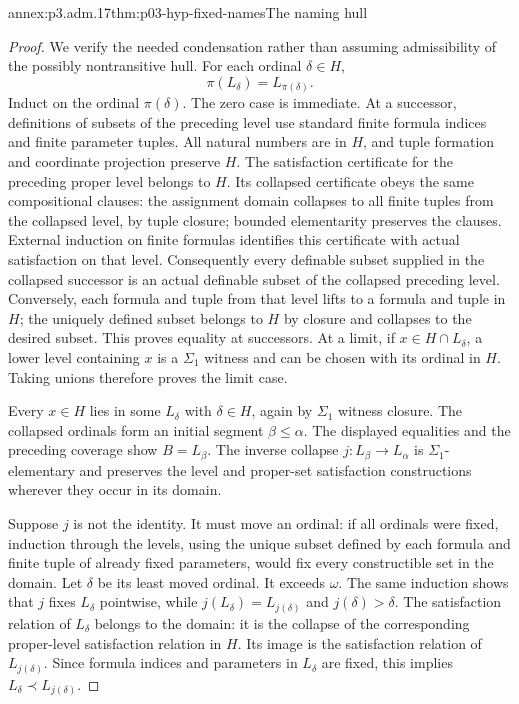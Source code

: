 \begin{annexitem}{annex:p3.adm.17}{thm:p03-hyp-fixed-names}{The naming hull}
\begin{proof}
We verify the needed condensation rather than assuming admissibility
of the possibly nontransitive hull. For each ordinal \(\delta\in H\),
\[
 \pi(L_\delta)=L_{\pi(\delta)}.
\]
Induct on the ordinal \(\pi(\delta)\). The zero case is immediate.
At a successor, definitions of subsets of the preceding level use
standard finite formula indices and finite parameter tuples. All
natural numbers are in \(H\), and tuple formation and coordinate
projection preserve \(H\). The satisfaction certificate for the
preceding proper level belongs to \(H\). Its collapsed certificate
obeys the same compositional clauses: the assignment domain collapses
to all finite tuples from the collapsed level, by tuple closure;
bounded elementarity preserves the clauses. External induction on
finite formulas identifies this certificate with actual satisfaction
on that level. Consequently every definable subset supplied in the
collapsed successor is an actual definable subset of the collapsed
preceding level. Conversely, each formula and tuple from that level
lifts to a formula and tuple in \(H\); the uniquely defined subset
belongs to \(H\) by closure and collapses to the desired subset.
This proves equality at successors. At a limit, if \(x\in H\cap
L_\delta\), a lower level containing \(x\) is a \(\Sigma_1\)
witness and can be chosen with its ordinal in \(H\). Taking unions
therefore proves the limit case.

Every \(x\in H\) lies in some \(L_\delta\) with \(\delta\in H\),
again by \(\Sigma_1\) witness closure. The collapsed ordinals form an
initial segment \(\beta\leq\alpha\). The displayed equalities and
the preceding coverage show \(B=L_\beta\). The inverse collapse
\(j:L_\beta\to L_\alpha\) is \(\Sigma_1\)-elementary and preserves
the level and proper-set satisfaction constructions wherever they
occur in its domain.

Suppose \(j\) is not the identity. It must move an ordinal: if all
ordinals were fixed, induction through the levels, using the unique
subset defined by each formula and finite tuple of already fixed
parameters, would fix every constructible set in the domain. Let
\(\delta\) be its least moved ordinal. It exceeds \(\omega\).
The same induction shows that \(j\) fixes \(L_\delta\) pointwise,
while \(j(L_\delta)=L_{j(\delta)}\) and \(j(\delta)>\delta\).
The satisfaction relation of \(L_\delta\) belongs to the domain:
it is the collapse of the corresponding proper-level satisfaction
relation in \(H\). Its image is the satisfaction relation of
\(L_{j(\delta)}\). Since formula indices and parameters in
\(L_\delta\) are fixed, this implies
\(L_\delta\prec L_{j(\delta)}\).


\end{proof}
\end{annexitem}
